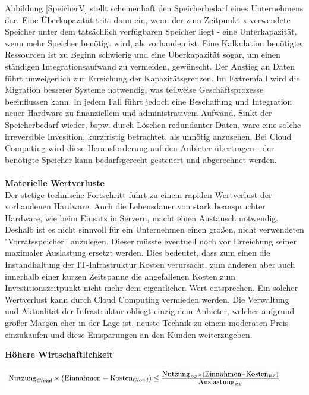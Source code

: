 \documentclass[13pt,a4paper,bibliography=totocnumbered,listof=totocnumbered]{scrartcl}
\begin{document}
Abbildung \ref{SpeicherV} stellt schemenhaft den Speicherbedarf eines Unternehmens dar. Eine Überkapazität tritt dann ein, wenn der zum Zeitpunkt x verwendete Speicher unter dem tatsächlich verfügbaren Speicher liegt - eine Unterkapazität, wenn mehr Speicher benötigt wird, als vorhanden ist. Eine Kalkulation benötigter Ressourcen ist zu Beginn schwierig und eine Überkapazität sogar, um einen ständigen Integrationsaufwand zu vermeiden, gewünscht. Der Anstieg an Daten führt unweigerlich zur Erreichung der Kapazitätsgrenzen. Im Extremfall wird die Migration besserer Systeme notwendig, was teilweise Geschäftsprozesse beeinflussen kann. In jedem Fall führt jedoch eine Beschaffung und Integration neuer Hardware zu finanziellem und administrativem Aufwand. Sinkt der Speicherbedarf wieder, bspw. durch Löschen redundanter Daten, wäre eine solche irreversible Invesition, kurzfristig betrachtet, als unnötig anzusehen. Bei Cloud Computing wird diese Herausforderung auf den Anbieter übertragen - der benötigte Speicher kann bedarfsgerecht gesteuert und abgerechnet werden.\\\\
\textbf{Materielle Wertverluste}\\
Der stetige technische Fortschritt führt zu einem rapiden Wertverlust der vorhandenen Hardware. Auch die Lebensdauer von stark beanspruchter Hardware, wie beim Einsatz in Servern, macht einen Austausch notwendig. Deshalb ist es nicht sinnvoll für ein Unternehmen einen großen, nicht verwendeten "Vorratsspeicher'' anzulegen. Dieser müsste eventuell noch vor Erreichung seiner maximaler Auslastung ersetzt werden. Dies bedeutet, dass zum einen die Instandhaltung der IT-Infrastruktur Kosten verursacht, zum anderen aber auch innerhalb einer kurzen Zeitspanne die angefallenen Kosten zum Investitionszeitpunkt nicht mehr dem eigentlichen Wert entsprechen. Ein solcher Wertverlust kann durch Cloud Computing vermieden werden. Die Verwaltung und Aktualität der Infrastruktur obliegt einzig dem Anbieter, welcher aufgrund großer Margen eher in der Lage ist, neuste Technik zu einem moderaten Preis einzukaufen und diese Einsparungen an den Kunden weiterzugeben.
\pagebreak

\textbf{Höhere Wirtschaftlichkeit}
\vspace{1em}
$\;$\\
\begin{minipage}{\linewidth}
	\centering
	\includegraphics[width=1.0\linewidth]{./img/Wirtschaftlichkeit.jpg}
 	\label{WirtschaftlichkeitV}
\end{minipage}
\vspace{1em}
\end{document}
